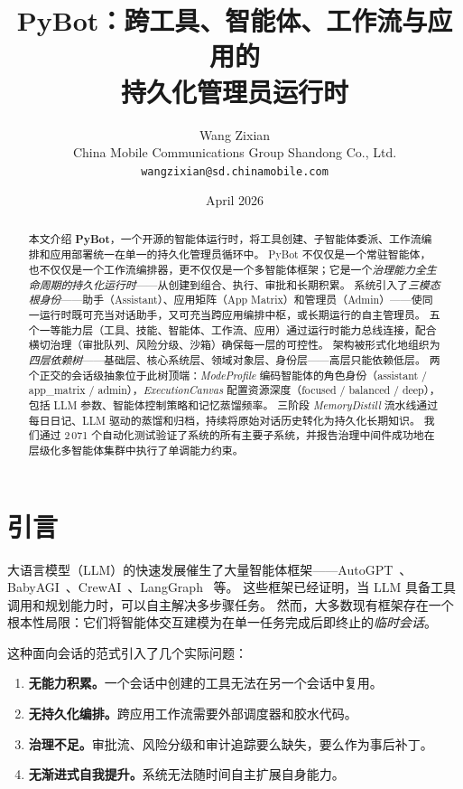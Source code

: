 \documentclass[11pt,a4paper]{article}
\title{%
  \textbf{PyBot：跨工具、智能体、工作流与应用的 \\
  持久化管理员运行时}%
}
\author{Wang Zixian\\
China Mobile Communications Group Shandong Co., Ltd.\\
{\tt\small wangzixian@sd.chinamobile.com}
}
\date{April 2026}
\begin{document}
\maketitle

\begin{abstract}
本文介绍 \textbf{PyBot}，一个开源的智能体运行时，将工具创建、子智能体委派、工作流编排和应用部署统一在单一的持久化管理员循环中。
PyBot 不仅仅是一个常驻智能体，也不仅仅是一个工作流编排器，更不仅仅是一个多智能体框架；它是一个\emph{治理能力全生命周期的持久化运行时}——从创建到组合、执行、审批和长期积累。
系统引入了\emph{三模态根身份}——助手（Assistant）、应用矩阵（App Matrix）和管理员（Admin）——使同一运行时既可充当对话助手，又可充当跨应用编排中枢，或长期运行的自主管理员。
五个一等能力层（工具、技能、智能体、工作流、应用）通过运行时能力总线连接，配合横切治理（审批队列、风险分级、沙箱）确保每一层的可控性。
架构被形式化地组织为\emph{四层依赖树}——基础层、核心系统层、领域对象层、身份层——高层只能依赖低层。
两个正交的会话级抽象位于此树顶端：\emph{ModeProfile} 编码智能体的角色身份（assistant / app\_matrix / admin），\emph{ExecutionCanvas} 配置资源深度（focused / balanced / deep），包括 LLM 参数、智能体控制策略和记忆蒸馏频率。
三阶段 \emph{MemoryDistill} 流水线通过每日日记、LLM 驱动的蒸馏和归档，持续将原始对话历史转化为持久化长期知识。
我们通过 2\,071 个自动化测试验证了系统的所有主要子系统，并报告治理中间件成功地在层级化多智能体集群中执行了单调能力约束。
\end{abstract}

\section{引言}
\label{sec:intro}

大语言模型（LLM）的快速发展催生了大量智能体框架——AutoGPT~\cite{autogpt2023}、BabyAGI~\cite{babyagi2023}、CrewAI~\cite{crewai2024}、LangGraph~\cite{langgraph2024} 等。
这些框架已经证明，当 LLM 具备工具调用和规划能力时，可以自主解决多步骤任务。
然而，大多数现有框架存在一个根本性局限：它们将智能体交互建模为在单一任务完成后即终止的\emph{临时会话}。

这种面向会话的范式引入了几个实际问题：
\begin{enumerate}[label=(\alph*)]
  \item \textbf{无能力积累。}一个会话中创建的工具无法在另一个会话中复用。
  \item \textbf{无持久化编排。}跨应用工作流需要外部调度器和胶水代码。
  \item \textbf{治理不足。}审批流、风险分级和审计追踪要么缺失，要么作为事后补丁。
  \item \textbf{无渐进式自我提升。}系统无法随时间自主扩展自身能力。
\end{enumerate}
\end{document}
